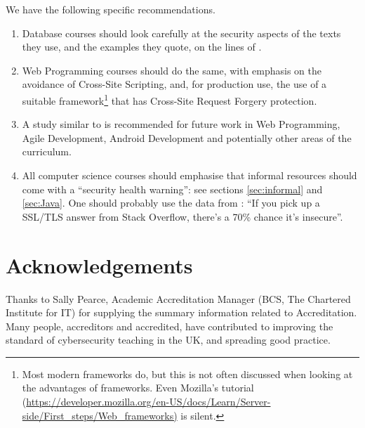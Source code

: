 \documentclass[conference]{IEEEtran}
\begin{document}
We have the following specific recommendations.
\begin{enumerate}
\item Database courses should look carefully at the security aspects of the texts they use, and the examples they quote, on the lines of \cite{Drop2019}.
\item Web Programming courses should  do the same, with emphasis on the avoidance of Cross-Site Scripting, and, for production use, the use of a suitable framework\footnote{Most modern frameworks do, but this is not often discussed when looking at the advantages of frameworks. Even Mozilla's tutorial (\url{https://developer.mozilla.org/en-US/docs/Learn/Server-side/First_steps/Web_frameworks)} is silent.} that has Cross-Site Request Forgery protection. 
\item A study similar to \cite{Drop2019} is recommended for future work in Web Programming, Agile Development, Android Development and potentially other areas of the curriculum.
\item All computer science courses should emphasise that informal resources should come with a ``security health warning'': see sections \ref{sec:informal} and \ref{sec:Java}. One should probably use the data from \cite{Chenetal2019a}: ``If you pick up a SSL/TLS answer from Stack Overflow, there's a 70\% chance it's insecure''.
\end{enumerate}

\section*{Acknowledgements}
Thanks to Sally Pearce, Academic Accreditation Manager (BCS, The Chartered Institute for IT) for supplying the summary information related to Accreditation. Many people, accreditors and accredited, have contributed to improving the standard of cybersecurity teaching in the UK, and spreading good practice.



 
\end{document}
